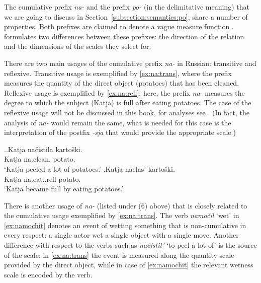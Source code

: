 The cumulative  prefix \textit{na-}   and the prefix \textit{po-}   (in the delimitative  meaning) that we are going to discuss in Section~\ref{subsection:semantics:po}, share a number of properties. Both prefixes are claimed to denote a vague measure function \citep{Filip:00, Souchkova:04}. \citet{Souchkova:04} formulates two differences between these prefixes: the direction of the relation and the dimensions of the scales they select for.

There are two main usages of the cumulative  prefix \textit{na-}   in Russian: transitive and reflexive. Transitive usage is exemplified by \ref{ex:na:trans}, where the prefix measures the quantity of the direct object (potatoes) that has been cleaned. Reflexive usage is exemplified by \ref{ex:na:refl}; here, the prefix \textit{na-}   measures the degree to which the subject (Katja) is full after eating potatoes. The case of the reflexive usage will not be discussed in this book, for analyses see \citet{KaganPereltsvaig:11a,KaganPereltsvaig:11b,Souchkova:04,Filip:00,Filip:05}. (In fact, the analysis of \textit{na-}   would remain the same, what is needed for this case is the interpretation of the postfix  \textit{-sja} that would provide the appropriate scale.)

\ex.\ag.\label{ex:na:trans}Katja na\v{c}istila karto\v{s}ki.\\
Katja na.clean. potato.\\
\trans `Katja peeled a lot of potatoes.'
\bg.\label{ex:na:refl}Katja naelas' karto\v{s}ki.\\
Katja na.eat..refl potato.\\
\trans `Katja became full by eating potatoes.'

There is another usage of \textit{na-}   (listed under (6) above) that is closely related to the cumulative  usage exemplified by \ref{ex:na:trans}. The verb \textit{namo\v{c}il} `wet' in \ref{ex:namochit} denotes an event of wetting something that is non-cumulative  in every respect: a single actor wet a single object with a single move. Another difference with respect to the verbs such as \textit{na\v{c}istit'} `to peel a lot of' is the source of the scale: in \ref{ex:na:trans} the event is measured along the quantity scale provided by the direct object, while in case of \ref{ex:namochit} the relevant wetness scale is encoded by the verb.

